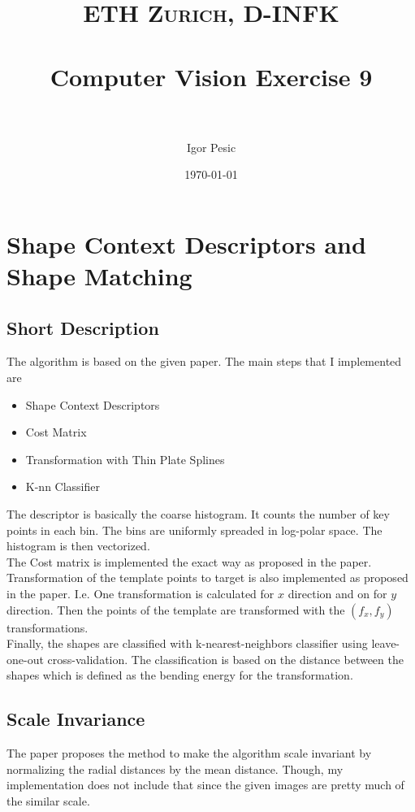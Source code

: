 \documentclass[paper=a4, fontsize=11pt]{scrartcl} %
\title{	
\normalfont \normalsize 
\textsc{ETH Zurich, D-INFK} \\ [25pt] %
\horrule{0.5pt} \\[0.4cm] %
\huge Computer Vision Exercise 9 \\ %
\horrule{2pt} \\[0.5cm] %
}
\author{Igor Pesic} %
\date{\normalsize\today} %
\numberwithin{equation}{section} %
\numberwithin{figure}{section} %
\numberwithin{table}{section} %
\begin{document}
\maketitle %


\section{Shape Context Descriptors and Shape Matching}

\subsection{Short Description}

The algorithm is based on the given paper. The main steps that I implemented are 
\begin{itemize}
\item Shape Context Descriptors
\item Cost Matrix
\item Transformation with Thin Plate Splines
\item K-nn Classifier
\end{itemize}

The descriptor is basically the coarse histogram. It counts the number of key points in each bin. The bins are uniformly spreaded in log-polar space. The histogram is then vectorized.\\
The Cost matrix is implemented the exact way as proposed in the paper.\\
Transformation of the template points to target is also implemented as proposed in the paper. I.e. One transformation is calculated for $x$ direction and on for $y$ direction. Then the points of the template are transformed with the $(f_x,f_y)$ transformations.\\
Finally, the shapes are classified with k-nearest-neighbors classifier using leave-one-out cross-validation. The classification is based on the distance between the shapes which is defined as the bending energy for the transformation.\\

\subsection{Scale Invariance}
The paper proposes the method to make the algorithm scale invariant by normalizing the radial distances by the mean distance. Though, my implementation does not include that since the given images are pretty much of the similar scale.
\end{document}
